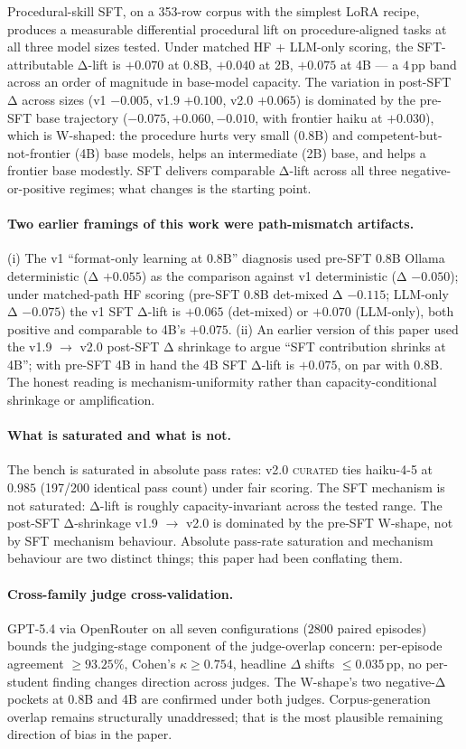 \documentclass[10pt]{article}
\newcommand{\CU}{\textsc{curated}\xspace}
\begin{document}
Procedural-skill SFT, on a 353-row corpus with the simplest LoRA recipe, produces a measurable differential procedural lift on procedure-aligned tasks at all three model sizes tested. Under matched HF + LLM-only scoring, the SFT-attributable Δ-lift is $+0.070$ at 0.8B, $+0.040$ at 2B, $+0.075$ at 4B --- a $4$\,pp band across an order of magnitude in base-model capacity. The variation in post-SFT Δ across sizes (v1 $-0.005$, v1.9 $+0.100$, v2.0 $+0.065$) is dominated by the pre-SFT base trajectory ($-0.075, +0.060, -0.010$, with frontier haiku at $+0.030$), which is W-shaped: the procedure hurts very small (0.8B) and competent-but-not-frontier (4B) base models, helps an intermediate (2B) base, and helps a frontier base modestly. SFT delivers comparable Δ-lift across all three negative-or-positive regimes; what changes is the starting point.

\paragraph{Two earlier framings of this work were path-mismatch artifacts.} (i) The v1 ``format-only learning at 0.8B'' diagnosis used pre-SFT 0.8B Ollama deterministic (Δ $+0.055$) as the comparison against v1 deterministic (Δ $-0.050$); under matched-path HF scoring (pre-SFT 0.8B det-mixed Δ $-0.115$; LLM-only Δ $-0.075$) the v1 SFT Δ-lift is $+0.065$ (det-mixed) or $+0.070$ (LLM-only), both positive and comparable to 4B's $+0.075$. (ii) An earlier version of this paper used the v1.9 $\to$ v2.0 post-SFT Δ shrinkage to argue ``SFT contribution shrinks at 4B''; with pre-SFT 4B in hand the 4B SFT Δ-lift is $+0.075$, on par with 0.8B. The honest reading is mechanism-uniformity rather than capacity-conditional shrinkage or amplification.

\paragraph{What is saturated and what is not.} The bench is saturated in absolute pass rates: v2.0 \CU{} ties haiku-4-5 at $0.985$ (197/200 identical pass count) under fair scoring. The SFT mechanism is not saturated: Δ-lift is roughly capacity-invariant across the tested range. The post-SFT Δ-shrinkage v1.9 $\to$ v2.0 is dominated by the pre-SFT W-shape, not by SFT mechanism behaviour. Absolute pass-rate saturation and mechanism behaviour are two distinct things; this paper had been conflating them.

\paragraph{Cross-family judge cross-validation.} GPT-5.4 via OpenRouter on all seven configurations ($2800$ paired episodes) bounds the judging-stage component of the judge-overlap concern: per-episode agreement $\geq 93.25\%$, Cohen's $\kappa \geq 0.754$, headline $\Delta$ shifts $\leq 0.035$\,pp, no per-student finding changes direction across judges. The W-shape's two negative-Δ pockets at 0.8B and 4B are confirmed under both judges. Corpus-generation overlap remains structurally unaddressed; that is the most plausible remaining direction of bias in the paper.
\end{document}
